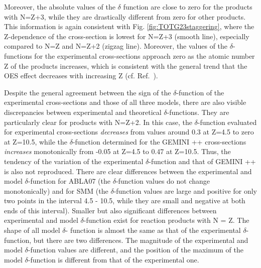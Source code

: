 Moreover, the absolute values of the $\delta$ function are close to zero for the products with N=Z+3, while they are drastically different from zero for other products. This information is again consistent with Fig. \ref{fig:TOTG23staggering}, where the Z-dependence of the cross-section is lowest for N=Z+3 (smooth line), especially compared to N=Z and N=Z+2 (zigzag line). Moreover, the values of the $\delta$-functions for the experimental cross-sections approach zero as the atomic number Z of the products increases, which is consistent with the general trend that the OES effect decreases with increasing Z (cf. Ref.~\cite{Mei_OES}).

Despite the general agreement between the sign of the $\delta$-function of the experimental cross-sections and those of all three models, there are also visible discrepancies between experimental and theoretical $\delta$-functions. They are particularly clear for products with N=Z+2. In this case, the $\delta$-function evaluated for experimental cross-sections \emph{decreases} from values around 0.3 at
Z=4.5 to zero at Z=10.5, while the $\delta$-function determined for the GEMINI ++
cross-sections \emph{increases} monotonically from -0.05 at Z=4.5 to 0.47 at Z=10.5.
Thus, the tendency of the variation of the experimental $\delta$-function and that of GEMINI ++ is also not reproduced.
There are clear differences between the experimental and model $\delta$-function for
ABLA07 (the $\delta$-function values do not change monotonically) and for SMM
(the $\delta$-function values are large and positive for only two points in the interval 4.5 - 10.5, while they are small and negative at both ends of this interval).
Smaller but also significant differences between experimental and model $\delta$-function exist for reaction products with N = Z. The shape of all model
$\delta$- function is almost the same as that of the experimental $\delta$- function, but there are two differences. The magnitude of the experimental and model $\delta$-function values are different, and the position of the maximum of the model $\delta$-function is different from that of the experimental one.

